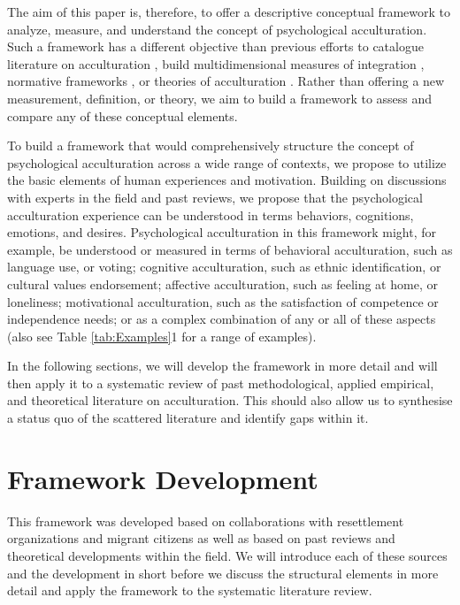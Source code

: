 \documentclass[nobib]{tufte-handout}
\begin{document}
 The aim of this paper is, therefore, to offer a descriptive conceptual framework to analyze, measure, and understand the concept of psychological acculturation. Such a framework has a different objective than previous efforts to catalogue literature on acculturation \citep[e.g.,][]{Castels2003}, build multidimensional measures of integration \citep[e.g.,][]{Harder2018}, normative frameworks \citep[e.g.,][]{Ager2008a}, or theories of acculturation \citep[e.g.,][]{Berry2005}. Rather than offering a new measurement, definition, or theory, we aim to build a framework to assess and compare any of these conceptual elements. 

To build a framework that would comprehensively structure the concept of psychological acculturation across a wide range of contexts, we propose to utilize the basic elements of human experiences and motivation.
Building on discussions with experts in the field and past reviews, we propose that the psychological acculturation experience can be understood in terms behaviors, cognitions, emotions, and desires. Psychological acculturation in this framework might, for example, be understood or measured in terms of behavioral acculturation, such as language use, or voting; cognitive acculturation, such as ethnic identification, or cultural values endorsement; affective acculturation, such as feeling at home, or loneliness; motivational acculturation, such as the satisfaction of competence or independence needs; or as a complex combination of any or all of these aspects (also see Table \ref{tab:Examples}1 for a range of examples). 

In the following sections, we will develop the framework in more detail and will then apply it to a systematic review of past methodological, applied empirical, and theoretical literature on acculturation. This should also allow us to synthesise a status quo of the scattered literature and identify gaps within it.



\section{Framework Development} 

This framework was developed based on collaborations with resettlement organizations and migrant citizens as well as based on past reviews and theoretical developments within the field. We will introduce each of these sources and the development in short before we discuss the structural elements in more detail and apply the framework to the systematic literature review.
\end{document}
